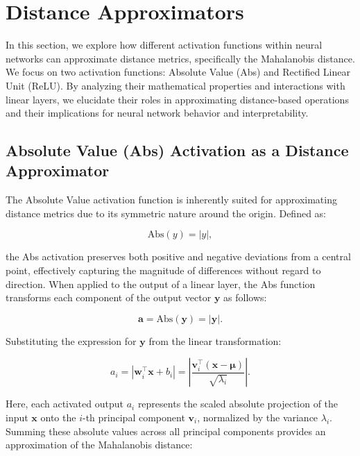 
\section{Distance Approximators}
\label{sec:distance_approximators}

In this section, we explore how different activation functions within neural networks can approximate distance metrics, specifically the Mahalanobis distance. We focus on two activation functions: Absolute Value (Abs) and Rectified Linear Unit (ReLU). By analyzing their mathematical properties and interactions with linear layers, we elucidate their roles in approximating distance-based operations and their implications for neural network behavior and interpretability.

\subsection{Absolute Value (Abs) Activation as a Distance Approximator}

The Absolute Value activation function is inherently suited for approximating distance metrics due to its symmetric nature around the origin. Defined as:

\begin{equation}
\text{Abs}(y) = |y|,
\end{equation}

the Abs activation preserves both positive and negative deviations from a central point, effectively capturing the magnitude of differences without regard to direction. When applied to the output of a linear layer, the Abs function transforms each component of the output vector $\mathbf{y}$ as follows:

\begin{equation}
\mathbf{a} = \text{Abs}(\mathbf{y}) = |\mathbf{y}|.
\end{equation}

Substituting the expression for $\mathbf{y}$ from the linear transformation:

\begin{equation}
a_i = \left| \mathbf{w}_i^\top \mathbf{x} + b_i \right| = \left| \frac{\mathbf{v}_i^\top (\mathbf{x} - \boldsymbol{\mu})}{\sqrt{\lambda_i}} \right|.
\end{equation}

Here, each activated output $a_i$ represents the scaled absolute projection of the input $\mathbf{x}$ onto the $i$-th principal component $\mathbf{v}_i$, normalized by the variance $\lambda_i$. Summing these absolute values across all principal components provides an approximation of the Mahalanobis distance:

